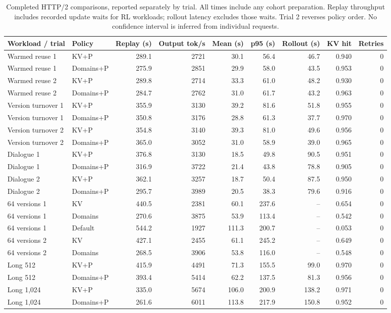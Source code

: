 \begin{table}[t]\centering\small
\begin{tabular}{llrrrrrrr}\toprule
Workload / trial & Policy & Replay (s) & Output tok/s & Mean (s) & p95 (s) & Rollout (s) & KV hit & Retries\\\midrule
Warmed reuse 1 & KV+P & 289.1 & 2721 & 30.1 & 56.4 & 46.7 & 0.940 & 0 \\
Warmed reuse 1 & Domains+P & 275.9 & 2851 & 29.9 & 58.0 & 43.5 & 0.953 & 0 \\
Warmed reuse 2 & KV+P & 289.8 & 2714 & 33.3 & 61.0 & 48.2 & 0.930 & 0 \\
Warmed reuse 2 & Domains+P & 284.7 & 2762 & 31.0 & 61.7 & 43.2 & 0.963 & 0 \\
Version turnover 1 & KV+P & 355.9 & 3130 & 39.2 & 81.6 & 51.8 & 0.955 & 0 \\
Version turnover 1 & Domains+P & 350.8 & 3176 & 28.8 & 61.3 & 37.7 & 0.970 & 0 \\
Version turnover 2 & KV+P & 354.8 & 3140 & 39.3 & 81.0 & 49.6 & 0.956 & 0 \\
Version turnover 2 & Domains+P & 365.0 & 3052 & 31.0 & 58.9 & 39.0 & 0.965 & 0 \\
Dialogue 1 & KV+P & 376.8 & 3130 & 18.5 & 49.8 & 90.5 & 0.951 & 0 \\
Dialogue 1 & Domains+P & 316.9 & 3722 & 21.4 & 43.8 & 78.8 & 0.905 & 0 \\
Dialogue 2 & KV+P & 362.1 & 3257 & 18.7 & 50.4 & 87.5 & 0.950 & 0 \\
Dialogue 2 & Domains+P & 295.7 & 3989 & 20.5 & 38.3 & 79.6 & 0.916 & 0 \\
64 versions 1 & KV & 440.5 & 2381 & 60.1 & 237.6 & -- & 0.654 & 0 \\
64 versions 1 & Domains & 270.6 & 3875 & 53.9 & 113.4 & -- & 0.542 & 0 \\
64 versions 1 & Default & 544.2 & 1927 & 111.3 & 200.7 & -- & 0.053 & 0 \\
64 versions 2 & KV & 427.1 & 2455 & 61.1 & 245.2 & -- & 0.649 & 0 \\
64 versions 2 & Domains & 268.5 & 3906 & 53.8 & 116.0 & -- & 0.548 & 0 \\
Long 512 & KV+P & 415.9 & 4491 & 71.3 & 155.5 & 99.0 & 0.970 & 0 \\
Long 512 & Domains+P & 393.4 & 5414 & 62.2 & 137.5 & 81.3 & 0.956 & 0 \\
Long 1,024 & KV+P & 335.0 & 5674 & 106.0 & 200.9 & 138.2 & 0.971 & 0 \\
Long 1,024 & Domains+P & 261.6 & 6011 & 113.8 & 217.9 & 150.8 & 0.952 & 0 \\
\bottomrule\end{tabular}
\caption{Completed HTTP/2 comparisons, reported separately by trial. All times include any cohort preparation. Replay throughput includes recorded update waits for RL workloads; rollout latency excludes those waits. Trial 2 reverses policy order. No confidence interval is inferred from individual requests.}\label{tab:primary}
\end{table}
